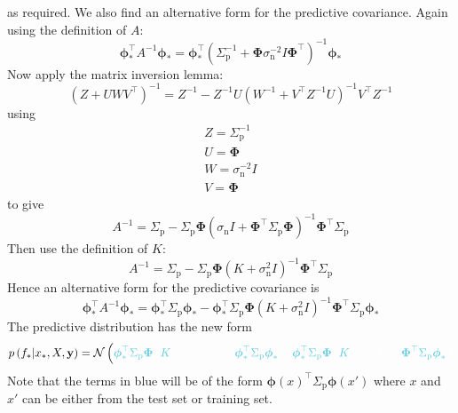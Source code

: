 \documentclass[11pt]{report} %
\begin{document}
as required. We also find an alternative form for the predictive covariance. Again using the definition of $A$:
\begin{equation}
\boldsymbol{\phi}_{*}^{\top}A^{-1}\boldsymbol{\phi}_{*}=\boldsymbol{\phi}_{*}^{\top}\left(\Sigma_{\mathrm{p}}^{-1}+\boldsymbol{\Phi}\sigma_{\mathrm{n}}^{-2}I\boldsymbol{\Phi}^{\top}\right)^{-1}\boldsymbol{\phi}_{*}
\end{equation}
Now apply the matrix inversion lemma:
\begin{equation}
\left(Z+UWV^{\top}\right)^{-1}=Z^{-1}-Z^{-1}U\left(W^{-1}+V^{\top}Z^{-1}U\right)^{-1}V^{\top}Z^{-1}
\end{equation}
using
\begin{gather}
Z=\Sigma_{\mathrm{p}}^{-1} \\
U=\boldsymbol{\Phi} \\
W=\sigma_{\mathrm{n}}^{-2}I \\
V=\boldsymbol{\Phi}
\end{gather}
to give
\begin{equation}
A^{-1}=\Sigma_{\mathrm{p}}-\Sigma_{\mathrm{p}}\boldsymbol{\Phi}\left(\sigma_{\mathrm{n}}I+\boldsymbol{\Phi}^{\top}\Sigma_{\mathrm{p}}\boldsymbol{\Phi}\right)^{-1}\boldsymbol{\Phi}^{\top}\Sigma_{\mathrm{p}}
\end{equation}
Then use the definition of $K$:
\begin{equation}
A^{-1}=\Sigma_{\mathrm{p}}-\Sigma_{\mathrm{p}}\boldsymbol{\Phi}\left(K+\sigma_{\mathrm{n}}^{2}I\right)^{-1}\boldsymbol{\Phi}^{\top}\Sigma_{\mathrm{p}}
\end{equation}
Hence an alternative form for the predictive covariance is
\begin{equation}
\boldsymbol{\phi}_{*}^{\top}A^{-1}\boldsymbol{\phi}_{*}=\boldsymbol{\phi}_{*}^{\top}\Sigma_{\mathrm{p}}\boldsymbol{\phi}_{*}-\boldsymbol{\phi}_{*}^{\top}\Sigma_{\mathrm{p}}\boldsymbol{\Phi}\left(K+\sigma_{\mathrm{n}}^{2}I\right)^{-1}\boldsymbol{\Phi}^{\top}\Sigma_{\mathrm{p}}\boldsymbol{\phi}_{*}
\end{equation}
The predictive distribution has the new form
\begin{equation}
p\left(f_{*}\middle|x_{*},X,\mathbf{y}\right)=\mathcal{N}\left(\blue\boldsymbol{\phi}_{*}^{\top}\Sigma_{\mathrm{p}}\boldsymbol{\Phi}\black\left(\blue K\black +\sigma_{\mathrm{n}}^{2}I\right)^{-1}\mathbf{y}, \blue\boldsymbol{\phi}_{*}^{\top}\Sigma_{\mathrm{p}}\boldsymbol{\phi}_{*}\black-\blue\boldsymbol{\phi}_{*}^{\top}\Sigma_{\mathrm{p}}\boldsymbol{\Phi}\black\left(\blue K\black+\sigma_{\mathrm{n}}^{2}I\right)^{-1}\blue\boldsymbol{\Phi}^{\top}\Sigma_{\mathrm{p}}\boldsymbol{\phi}_{*}\black\right)
\end{equation}
Note that the terms in \blue blue \black will be of the form $\boldsymbol{\phi}\left(x\right)^{\top}\Sigma_{\mathrm{p}}\boldsymbol{\phi}\left(x'\right)$ where $x$ and $x'$ can be either from the test set or training set.
\end{document}
